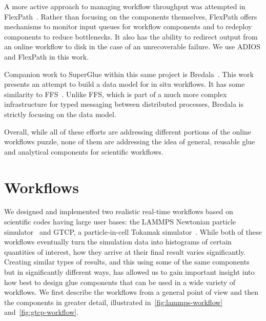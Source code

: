 \documentclass[conference]{IEEEtran}
\begin{document}
A more active approach to managing workflow throughput was attempted in
FlexPath~\cite{dayal:2014:flexpath}. Rather than focusing on the components
themselves, FlexPath offers mechanisms to monitor input queues for workflow
components and to redeploy components to reduce bottlenecks. It also has the
ability to redirect output from an online workflow to disk in the case of an
unrecoverable failure. We use ADIOS and FlexPath in this work.


Companion work to SuperGlue within this same project is
Bredala~\cite{dreher:2016:bredala}. This work presents an attempt to build a
data model for in situ workflows. It has some similarity to
FFS~\cite{eisenhauer:2011:ffs}. Unlike FFS, which is part of a much more
complex infrastructure for typed messaging between distributed processes,
Bredala is strictly focusing on the data model.

Overall, while all of these efforts are addressing different portions of the
online workflows puzzle, none of them are addressing the idea of general,
reusable glue and analytical components for scientific workflows.

\section{Workflows}
\label{s:workflow}

We designed and implemented two realistic real-time workflows based on
scientific codes having large user bases: the LAMMPS Newtonian particle
simulator~\cite{plimpton:1997:lammps} and GTCP, a particle-in-cell Tokamak
simulator~\cite{lin:gtc}. While both of these workflows eventually turn the
simulation data into histograms of certain quantities of interest, how they
arrive at their final result varies significantly. Creating similar types of
results, and this using some of the same components but in significantly
different ways, has allowed us to gain important insight into how best to
design glue components that can be used in a wide variety of workflows.
We first describe the workflows from a general point of view
and then the components in greater detail, illustrated
in~\autoref{fig:lammps-workflow} and~\autoref{fig:gtcp-workflow}.
\end{document}
